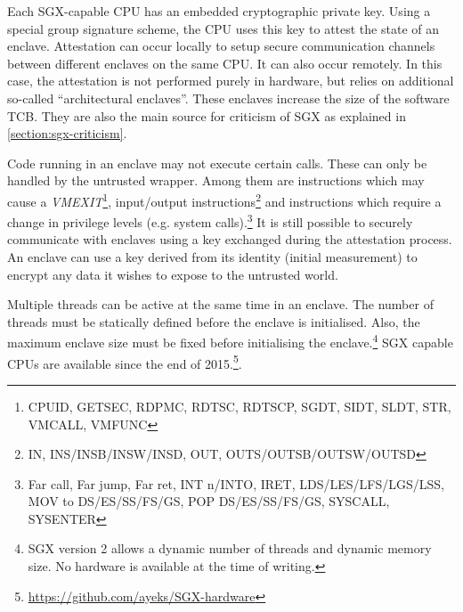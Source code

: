 Each SGX-capable CPU has an embedded cryptographic private key.\label{ID_85719808}
Using a special group signature scheme, the CPU uses this key to attest the state of an enclave.\cite[]{c}\label{ID_779581035}
Attestation can occur locally to setup secure communication channels between different enclaves on the same CPU.\cite[]{Anati2013}\label{ID_46728493}
It can also occur remotely. In this case, the attestation is not performed purely in hardware, but relies on additional so-called ``architectural enclaves''.\cite[]{sgx-explained}\label{ID_441975801}
These enclaves increase the size of the software TCB.\label{ID_1503953122}
They are also the main source for criticism of SGX as explained in \autoref{section:sgx-criticism}.\label{ID_419053144}

Code running in an enclave may not execute certain calls. These can only be handled by the untrusted wrapper.\cite[]{b}\label{ID_950941319}
Among them are instructions which may cause a \textit{VMEXIT}\footnote{CPUID, GETSEC, RDPMC, RDTSC, RDTSCP, SGDT, SIDT, SLDT, STR, VMCALL, VMFUNC}, input/output instructions\footnote{IN, INS/INSB/INSW/INSD, OUT, OUTS/OUTSB/OUTSW/OUTSD} and instructions which require a change in privilege levels (e.g. system calls).\footnote{Far call, Far jump, Far ret, INT n/INTO, IRET, LDS/LES/LFS/LGS/LSS, MOV to DS/ES/SS/FS/GS, POP DS/ES/SS/FS/GS, SYSCALL, SYSENTER}\cite[]{sgx-dev}\label{ID_909354065}
It is still possible to securely communicate with enclaves using a key exchanged during the attestation process.\label{ID_798355081}
An enclave can use a key derived from its identity (initial measurement) to encrypt any data it wishes to expose to the untrusted world.\label{ID_971079488}

Multiple threads can be active at the same time in an enclave.\cite[]{McKeen2013}\label{ID_900329339}
The number of threads must be statically defined before the enclave is initialised. Also, the maximum enclave size must be fixed before initialising the enclave.\footnote{SGX version 2 allows a dynamic number of threads and dynamic memory size. No hardware is available at the time of writing.}\label{ID_1383514787}
SGX capable CPUs are available since the end of 2015.\footnote{\url{https://github.com/ayeks/SGX-hardware}}.\label{ID_1264019871}

